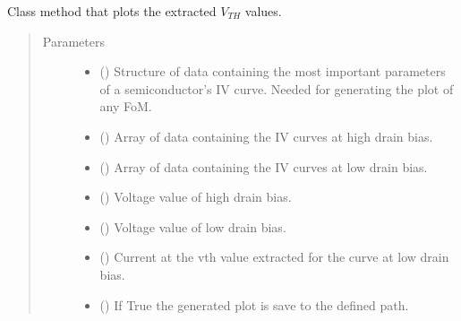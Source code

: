 \documentclass[letterpaper,10pt,english,openany, oneside]{sphinxmanual}
\begin{document}
\begin{fulllineitems}
\begin{fulllineitems}
\end{fulllineitems}


\begin{fulllineitems}
\label{\detokenize{index:fompy.fom.dibl_ext.plot}}
Class method that plots the extracted \(V_{TH}\) values.
\begin{quote}\begin{description}
\item[{Parameters}] \leavevmode\begin{itemize}
\item {} 
 () \textendash{} Structure of data containing the most important parameters of a semiconductor’s IV curve.
Needed for generating the plot of any FoM.

\item {} 
 () \textendash{} Array of data containing the IV curves at high drain bias.

\item {} 
 () \textendash{} Array of data containing the IV curves at low drain bias.

\item {} 
 () \textendash{} Voltage value of high drain bias.

\item {} 
 () \textendash{} Voltage value of low drain bias.

\item {} 
 () \textendash{} Current at the vth value extracted for the curve at low drain bias.

\item {} 
 () \textendash{} If True the generated plot is save to the defined path.


\end{itemize}
\end{description}
\end{quote}
\end{fulllineitems}
\end{fulllineitems}
\end{document}
